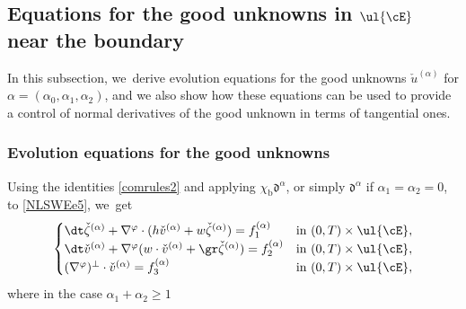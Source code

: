 \subsection{Equations for the good unknowns in $\ul{\cE}$ near the boundary}\label{subsect:EGUe}
In this subsection, we~derive evolution equations for the good unknowns $\check{u}^{(\alpha)}$ for $\alpha=(\alpha_0,\alpha_1,\alpha_2)$,
and we also show how these equations can be used to provide a control of normal derivatives of the good unknown in terms of tangential ones.

\subsubsection{Evolution equations for the good unknowns}
Using the identities \eqref{comrules2} and applying $\chi_\mathrm{b}\mathfrak{d}^{\alpha}$,
or simply $\mathfrak{d}^{\alpha}$ if $\alpha_1=\alpha_2=0$, to \eqref{NLSWEe5}, we~get
\begin{equation}\label{QLSWEe}
\begin{cases}
\dt\check{\zeta}^{(\alpha)}+\nabla^\varphi\cdot(h\check{v}^{(\alpha)}+w\check{\zeta}^{(\alpha)}) = f_1^{(\alpha)} &\text{in } (0,T)\times\ul{\cE}, \\
\dt\check{v}^{(\alpha)}+\nabla^\varphi(w\cdot\check{v}^{(\alpha)}+\gr\check{\zeta}^{(\alpha)}) = f_2^{(\alpha)} &\text{in } (0,T)\times\ul{\cE}, \\
(\nabla^\varphi)^\perp\cdot\check{v}^{(\alpha)} = f_3^{(\alpha)} &\text{in } (0,T)\times\ul{\cE},
\end{cases}
\end{equation}
where in the case $\alpha_1+\alpha_2\geq1$
